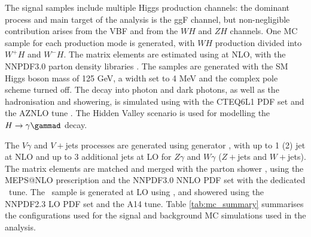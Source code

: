 The signal samples include multiple Higgs production channels: the dominant process and main target of the analysis is the ggF channel, but non-negligible contribution arises from the VBF and from the $WH$ and $ZH$ channels. One MC sample for each production mode is generated, with $WH$ production divided into $W^+H$ and $W^-H$. The matrix elements are estimated
using \POWHEG[v2] \cite{Alioli:2010xd,Frixione:2007vw} at NLO, with the NNPDF3.0 parton density libraries \cite{Martin:2009iq}. The samples are generated with the SM Higgs boson mass of 125 GeV, a width set to 4 MeV and the complex pole scheme turned off. The decay into photon and dark photons, as well as the hadronisation and showering, is simulated using \Pythia [8.245] with the CTEQ6L1 PDF set and the AZNLO tune \cite{Pumplin:2002vw}. The Hidden Valley scenario \cite{Carloni_2010} is used for modelling the $H\to\gamma\gammad$ decay. 

The $V\gamma$ and $V+$jets processes are generated using \Sherpa[2.2.14] generator \cite{Bothmann:2019yzt}, with up to 1 (2) jet at NLO and up to 3 additional jets at LO for $Z\gamma$ and $W\gamma$ ($Z+$jets and $W+$jets). The matrix elements are matched and merged with the \Sherpa parton shower \cite{Schumann:2007mg}, using the MEPS@NLO prescription \cite{Hoeche:2011fd,Catani:2001cc} and the NNPDF3.0 NNLO PDF set \cite{Martin:2009iq} with the dedicated \Sherpa\ tune. 
The \yjetdirect\ sample is generated at LO using \Pythia[8.186] \cite{Mrenna:2016sih,Sjostrand:2007gs}, and showered using the NNPDF2.3 LO PDF set and the A14 tune. 
Table \ref{tab:mc_summary} summarises the configurations used for the signal and background MC simulations used in the analysis. 

